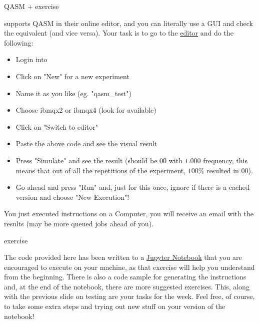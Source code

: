 \documentclass[aspectratio=43]{beamer}
\begin{document}
\begin{frame}[fragile]{QASM + \ibmqe exercise}
\small{
    \href{https://quantumexperience.ng.bluemix.net/qx/experience}{\ibmqe} supports QASM in their online editor, and you can literally use a GUI and check the \qasm equivalent (and vice versa).  Your task is to go to the \href{https://quantumexperience.ng.bluemix.net/qx/editor}{editor} and do the following:
    \begin{itemize}
        \itemsep0em 
        \item Login into \ibmqe
        \item Click on "New" for a new experiment
        \item Name it as you like (eg. "qasm\_test")
        \item Choose ibmqx2 or ibmqx4 (look for available)
        \item Click on "Switch to \qasm editor"
        \item Paste the above \qasm code and see the visual result
        \item Press "Simulate" and see the result (should be $00$ with $1.000$ frequency, this means that out of all the repetitions of the experiment, $100\%$ resulted in $00$).
        \item Go ahead and press "Run" and, just for this once, ignore if there is a cached version and choose "New Execution"!
    \end{itemize}
    You just executed instructions on a \q Computer, you will receive an email with the results (may be more queued jobs ahead of you).
}
\end{frame}

\begin{frame}{\qk exercise}
    \begin{card}
    The code provided here has been written to a \href{\weekTwo/exercises/w2_01.ipynb}{Jupyter Notebook} that you are encouraged to execute on your machine, as that exercise will help you understand \qk from the beginning. There is also a code sample for generating the \qasm instructions and, at the end of the notebook, there are more suggested exercises. This, along with the previous slide on testing \ibmqe are your tasks for the week. Feel free, of course, to take some extra steps and trying out new stuff on your version of the notebook!
    \end{card}
\pagenumber
\end{frame}



    
\end{document}
